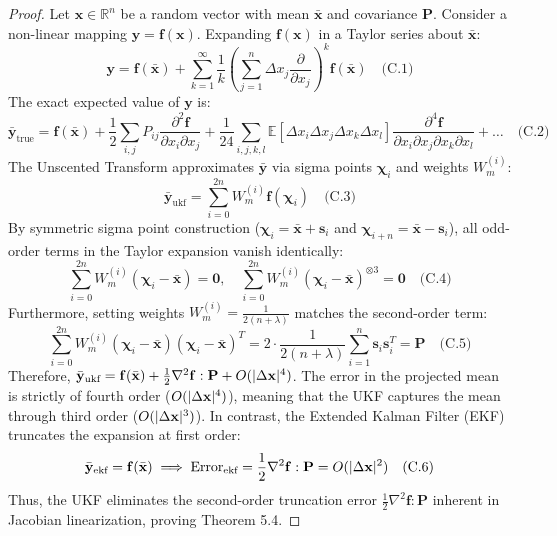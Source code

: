 \documentclass[preprint,12pt,authoryear]{elsarticle}
\theoremstyle{definition}
\begin{document}
\begin{proof}
Let $\mathbf{x} \in \mathbb{R}^n$ be a random vector with mean $\bar{\mathbf{x}}$ and covariance $\mathbf{P}$. Consider a non-linear mapping $\mathbf{y} = \mathbf{f}(\mathbf{x})$. Expanding $\mathbf{f}(\mathbf{x})$ in a Taylor series about $\bar{\mathbf{x}}$: $$\mathbf{y} = \mathbf{f}(\bar{\mathbf{x}}) + \sum_{k=1}^\infty \frac{1}{k\!} \left( \sum_{j=1}^n \Delta x_j \frac{\partial}{\partial x_j} \right)^k \mathbf{f}(\bar{\mathbf{x}}) \quad \text{(C.1)}$$ The exact expected value of $\mathbf{y}$ is: $$\bar{\mathbf{y}}_{\text{true}} = \mathbf{f}(\bar{\mathbf{x}}) + \frac{1}{2} \sum_{i,j} P_{ij} \frac{\partial^2 \mathbf{f}}{\partial x_i \partial x_j} + \frac{1}{24} \sum_{i,j,k,l} \mathbb{E}[\Delta x_i \Delta x_j \Delta x_k \Delta x_l] \frac{\partial^4 \mathbf{f}}{\partial x_i \partial x_j \partial x_k \partial x_l} + \dots \quad \text{(C.2)}$$ The Unscented Transform approximates $\bar{\mathbf{y}}$ via sigma points $\boldsymbol{\chi}_i$ and weights $W_m^{(i)}$: $$\bar{\mathbf{y}}_{\text{ukf}} = \sum_{i=0}^{2n} W_m^{(i)} \mathbf{f}(\boldsymbol{\chi}_i) \quad \text{(C.3)}$$ By symmetric sigma point construction ($\boldsymbol{\chi}_i = \bar{\mathbf{x}} + \mathbf{s}_i$ and $\boldsymbol{\chi}_{i+n} = \bar{\mathbf{x}} - \mathbf{s}_i$), all odd-order terms in the Taylor expansion vanish identically: $$\sum_{i=0}^{2n} W_m^{(i)} (\boldsymbol{\chi}_i - \bar{\mathbf{x}}) = \mathbf{0}, \quad \sum_{i=0}^{2n} W_m^{(i)} (\boldsymbol{\chi}_i - \bar{\mathbf{x}})^{\otimes 3} = \mathbf{0} \quad \text{(C.4)}$$ Furthermore, setting weights $W_m^{(i)} = \frac{1}{2(n+\lambda)}$ matches the second-order term: $$\sum_{i=0}^{2n} W_m^{(i)} (\boldsymbol{\chi}_i - \bar{\mathbf{x}})(\boldsymbol{\chi}_i - \bar{\mathbf{x}})^T = 2 \cdot \frac{1}{2(n+\lambda)} \sum_{i=1}^n \mathbf{s}_i \mathbf{s}_i^T = \mathbf{P} \quad \text{(C.5)}$$ Therefore, $\bar{\mathbf{y}}_{\text{ukf}} = \mathbf{f}(\bar{\mathbf{x}}) + \frac{1}{2} \nabla^2 \mathbf{f} : \mathbf{P} + O(\\|\Delta \mathbf{x}\\|^4)$. The error in the projected mean is strictly of fourth order ($O(\\|\Delta \mathbf{x}\\|^4)$), meaning that the UKF captures the mean through third order ($O(\\|\Delta \mathbf{x}\\|^3)$). In contrast, the Extended Kalman Filter (EKF) truncates the expansion at first order: $$\bar{\mathbf{y}}_{\text{ekf}} = \mathbf{f}(\bar{\mathbf{x}}) \implies \text{Error}_{\text{ekf}} = \frac{1}{2} \nabla^2 \mathbf{f} : \mathbf{P} = O(\\|\Delta \mathbf{x}\\|^2) \quad \text{(C.6)}$$ Thus, the UKF eliminates the second-order truncation error $\frac{1}{2} \nabla^2 \mathbf{f} : \mathbf{P}$ inherent in Jacobian linearization, proving Theorem 5.4. \end{proof}
\end{document}
